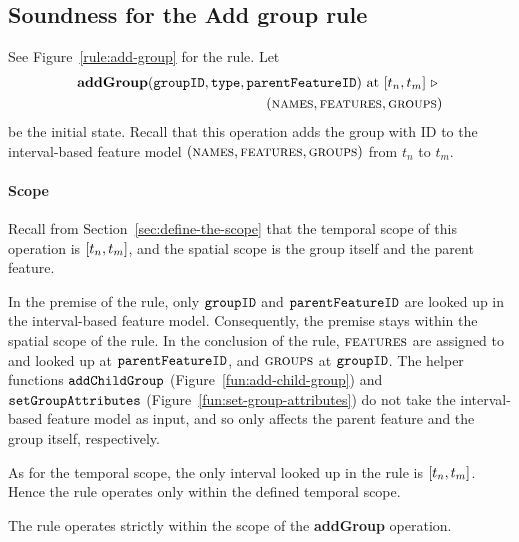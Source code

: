 
\subsection{Soundness for the Add group rule}
\label{sub:soundness-for-the-add-group-rule}

See Figure~\vref{rule:add-group} for the  rule. 
Let 
\begin{equation*}
   \begin{split}
      \textbf{addGroup}(\var{groupID}, \var{type}, \var{parentFeatureID})\text{ at }\interval{t_n}{t_m}
      \shove \\
   (\names{}, \features{}, \groups{})
\end{split}
\end{equation*}
be the initial state. Recall that this operation adds the group with ID  to the interval-based feature model $(\textsc{names}{}, \textsc{features}{}, \textsc{groups}{}{})$ from $t_n$ to $t_m$. 

\paragraph{Scope}

Recall from Section~\vref{sec:define-the-scope} that the temporal scope of this operation is $\interval{t_n}{t_m}$, and the spatial scope is the group itself and the parent feature.

In the premise of the rule, only $\texttt{groupID}$ and $\texttt{parentFeatureID}$ are looked up in the interval-based feature model. Consequently, the premise stays within the spatial scope of the rule. In the conclusion of the rule, $\textsc{features}{}$ are assigned to and looked up at $\texttt{parentFeatureID}$, and $\textsc{groups}{}{}$ at $\texttt{groupID}$. The helper functions $\texttt{addChildGroup}$ (Figure~\vref{fun:add-child-group}) and $\texttt{setGroupAttributes}$ (Figure~\vref{fun:set-group-attributes}) do not take the interval-based feature model as input, and so only affects the parent feature and the group itself, respectively.

As for the temporal scope, the only interval looked up in the rule is $\interval{t_n}{t_m}$. Hence the rule operates only within the defined temporal scope.
\\

\begin{lemma}
   The  rule operates strictly within the scope of the \textbf{addGroup} operation.
   \label{lemma:add-group-scope}
\end{lemma}

